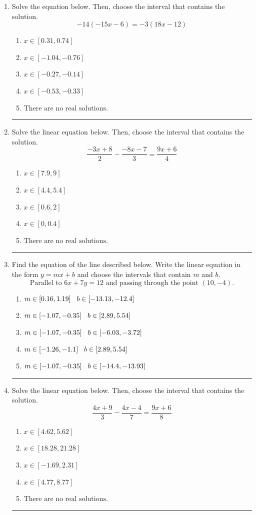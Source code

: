 \documentclass[14pt]{extbook}
\newcommand{\litem}[1]{\item#1\hspace*{-1cm}\rule{\textwidth}{0.4pt}}
\begin{document}
\begin{enumerate}
{\begin{enumerate}[label=\Alph*.]
\end{enumerate} }
\litem{
Solve the equation below. Then, choose the interval that contains the solution.\[ -14(-15x -6) = -3(18x -12) \]\begin{enumerate}[label=\Alph*.]
\item \( x \in [0.31, 0.74] \)
\item \( x \in [-1.04, -0.76] \)
\item \( x \in [-0.27, -0.14] \)
\item \( x \in [-0.53, -0.33] \)
\item \( \text{There are no real solutions.} \)

\end{enumerate} }
\litem{
Solve the linear equation below. Then, choose the interval that contains the solution.\[ \frac{-3x + 8}{2} - \frac{-8x -7}{3} = \frac{9x + 6}{4} \]\begin{enumerate}[label=\Alph*.]
\item \( x \in [7.9, 9] \)
\item \( x \in [4.4, 5.4] \)
\item \( x \in [0.6, 2] \)
\item \( x \in [0, 0.4] \)
\item \( \text{There are no real solutions.} \)

\end{enumerate} }
\litem{
Find the equation of the line described below. Write the linear equation in the form $ y=mx+b $ and choose the intervals that contain $m$ and $b$.\[ \text{Parallel to } 6 x + 7 y = 12 \text{ and passing through the point } (10, -4). \]\begin{enumerate}[label=\Alph*.]
\item \( m \in [0.16, 1.19] \hspace*{3mm} b \in [-13.13, -12.4] \)
\item \( m \in [-1.07, -0.35] \hspace*{3mm} b \in [2.89, 5.54] \)
\item \( m \in [-1.07, -0.35] \hspace*{3mm} b \in [-6.03, -3.72] \)
\item \( m \in [-1.26, -1.1] \hspace*{3mm} b \in [2.89, 5.54] \)
\item \( m \in [-1.07, -0.35] \hspace*{3mm} b \in [-14.4, -13.93] \)

\end{enumerate} }
\litem{
Solve the linear equation below. Then, choose the interval that contains the solution.\[ \frac{4x + 9}{3} - \frac{4x -4}{7} = \frac{9x + 6}{8} \]\begin{enumerate}[label=\Alph*.]
\item \( x \in [4.62, 5.62] \)
\item \( x \in [18.28, 21.28] \)
\item \( x \in [-1.69, 2.31] \)
\item \( x \in [4.77, 8.77] \)
\item \( \text{There are no real solutions.} \)


\end{enumerate}}
\end{enumerate}
\end{document}
